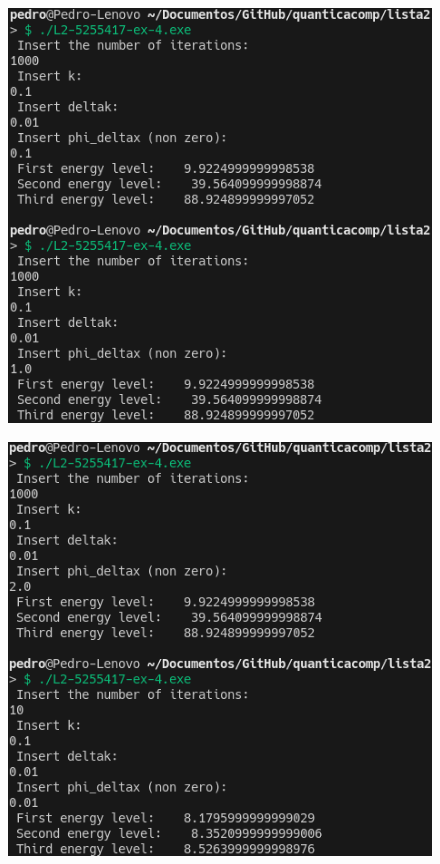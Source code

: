 \documentclass[12pt, a4paper]{article} %
\begin{document}
        \begin{figure}[H]    
            \centering
            \includegraphics[scale=0.8]{../images/results-ex4-5.png}
            \caption{}
        \end{figure}
        \begin{figure}[H]    
            \centering
            \includegraphics[scale=0.8]{../images/results-ex4-6.png}
            \caption{}
        \end{figure}
\end{document}
